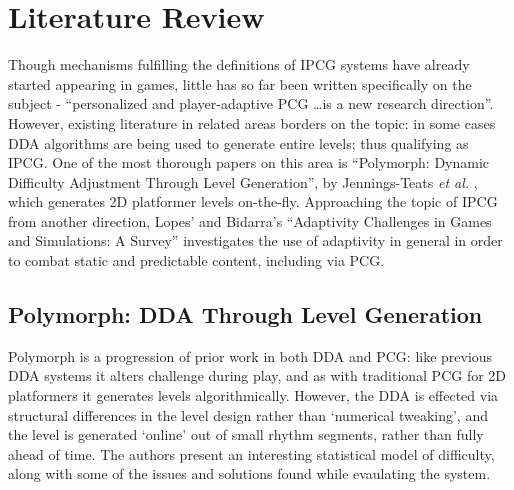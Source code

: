 \documentclass[a4paper,oneside,12pt,openany]{memoir}
\begin{document}
\chapter{Literature Review}
Though mechanisms fulfilling the definitions of IPCG systems have already started appearing in games, little has so far been written specifically on the subject - ``personalized and player-adaptive PCG \ldots is a new research direction''\cite{shaker2010towards}. However, existing literature in related areas borders on the topic: in some cases DDA algorithms are being used to generate entire levels; thus qualifying as IPCG. One of the most thorough papers on this area is ``Polymorph: Dynamic Difficulty Adjustment Through Level Generation'', by Jennings-Teats \emph{et al.} \cite{polymorph}, which generates 2D platformer levels on-the-fly. Approaching the topic of IPCG from another direction, Lopes' and Bidarra's ``Adaptivity Challenges in Games and Simulations: A Survey'' investigates the use of adaptivity in general in order to combat static and predictable content\cite{5765665}, including via PCG.

\section{Polymorph: DDA Through Level Generation}
Polymorph is a progression of prior work in both DDA and PCG: like previous DDA systems it alters challenge during play, and as with traditional PCG for 2D platformers it generates levels algorithmically. However, the DDA is effected via structural differences in the level design rather than `numerical tweaking', and the level is generated `online' out of small rhythm segments\cite{Smith:2009:RLG:1536513.1536548}, rather than fully ahead of time. The authors present an interesting statistical model of difficulty, along with some of the issues and solutions found while evaulating the system.
 \cite{polymorph}
\end{document}
